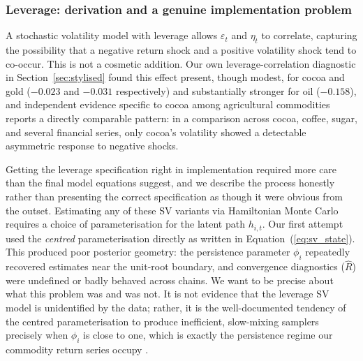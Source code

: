 \documentclass[preprint,12pt,authoryear]{elsarticle}
\begin{document}
\subsubsection{Leverage: derivation and a genuine implementation problem}
\label{sec:leverage}

A stochastic volatility model with leverage allows $\varepsilon_t$ and $\eta_t$ to correlate, capturing the possibility that a negative return shock and a positive volatility shock tend to co-occur. This is not a cosmetic addition. Our own leverage-correlation diagnostic in Section~\ref{sec:stylised} found this effect present, though modest, for cocoa and gold ($-0.023$ and $-0.031$ respectively) and substantially stronger for oil ($-0.158$), and independent evidence specific to cocoa among agricultural commodities \citep{roux2018} reports a directly comparable pattern: in a comparison across cocoa, coffee, sugar, and several financial series, only cocoa's volatility showed a detectable asymmetric response to negative shocks.

Getting the leverage specification right in implementation required more care than the final model equations suggest, and we describe the process honestly rather than presenting the correct specification as though it were obvious from the outset. Estimating any of these SV variants via Hamiltonian Monte Carlo requires a choice of parameterisation for the latent path $h_{i,t}$. Our first attempt used the \emph{centred} parameterisation directly as written in Equation~(\ref{eq:sv_state}). This produced poor posterior geometry: the persistence parameter $\phi_i$ repeatedly recovered estimates near the unit-root boundary, and convergence diagnostics ($\hat{R}$) were undefined or badly behaved across chains. We want to be precise about what this problem was and was not. It is not evidence that the leverage SV model is unidentified by the data; rather, it is the well-documented tendency of the centred parameterisation to produce inefficient, slow-mixing samplers precisely when $\phi_i$ is close to one, which is exactly the persistence regime our commodity return series occupy \citep{kastnerfruhwirthschnatter2014}.
\end{document}
